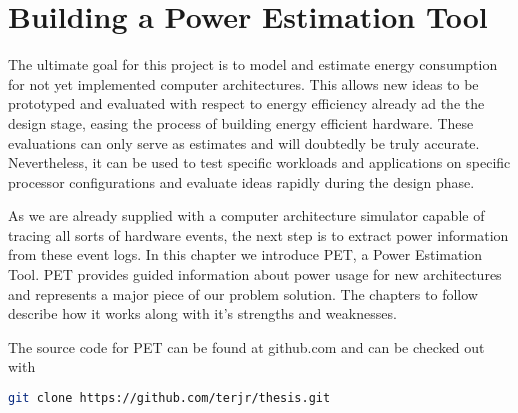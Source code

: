 \chapter{Building a Power Estimation Tool}

The ultimate goal for this project is to model and estimate energy consumption
for not yet implemented computer architectures. This allows new ideas to be prototyped
and evaluated with respect to energy efficiency already ad the the design stage,
easing the process of building energy efficient hardware. These evaluations can
only serve as estimates and will doubtedly be truly accurate. Nevertheless, it
can be used to test specific workloads and applications on specific processor
configurations and evaluate ideas rapidly during the design phase.

As we are already supplied with a computer architecture simulator capable of
tracing all sorts of hardware events, the next step is to extract power
information from these event logs. In this chapter we introduce PET, a Power
Estimation Tool. PET provides guided information about power usage for new
architectures and represents a major piece of our problem solution. The
chapters to follow describe how it works along with it's strengths and
weaknesses.

\noindent The source code for PET can be found at github.com and can be checked out with
\begin{lstlisting}[language=bash,numbers=none]
git clone https://github.com/terjr/thesis.git
\end{lstlisting}







